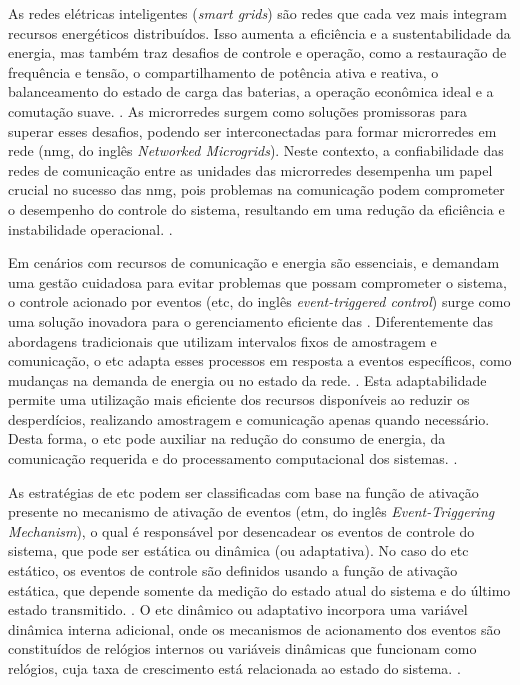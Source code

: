 As redes elétricas inteligentes (\textit{smart grids}) são redes que cada vez mais integram recursos energéticos distribuídos. Isso aumenta a eficiência e a sustentabilidade da energia, mas também traz desafios de controle e operação, como a restauração de frequência e tensão, o compartilhamento de potência ativa e reativa, o balanceamento do estado de carga das baterias, a operação econômica ideal e a comutação suave. \cite{Zhou2020}. As microrredes surgem como soluções promissoras para superar esses desafios, podendo ser interconectadas para formar microrredes em rede (\acrshort{nmg}, do inglês \textit{Networked Microgrids}). Neste contexto, a confiabilidade das redes de comunicação entre as unidades das microrredes desempenha um papel crucial no sucesso das \acrshort{nmg}, pois problemas na comunicação podem comprometer o desempenho do controle do sistema, resultando em uma redução da eficiência e instabilidade operacional. \cite{Zhou2020}.

Em cenários com recursos de comunicação e energia são essenciais, e demandam uma gestão cuidadosa para evitar problemas que possam comprometer o sistema, o controle acionado por eventos (\acrshort{etc}, do inglês \textit{event-triggered control}) surge como uma solução inovadora para o gerenciamento eficiente das . Diferentemente das abordagens tradicionais que utilizam intervalos fixos de amostragem e comunicação, o \acrshort{etc} adapta esses processos em resposta a eventos específicos, como mudanças na demanda de energia ou no estado da rede. \cite{coutinho2021}. Esta adaptabilidade permite uma utilização mais eficiente dos recursos disponíveis ao reduzir os desperdícios, realizando amostragem e comunicação apenas quando necessário. Desta forma, o \acrshort{etc} pode auxiliar na redução do consumo de energia, da comunicação requerida e do processamento computacional dos sistemas. \cite{coutinho2021}.


As estratégias de \acrshort{etc} podem ser classificadas com base na função de ativação presente no mecanismo de ativação de eventos (\acrshort{etm}, do inglês \textit{Event-Triggering Mechanism}), o qual é responsável por desencadear os eventos de controle do sistema, que pode ser estática ou dinâmica (ou adaptativa). No caso do \acrshort{etc} estático, os eventos de controle são definidos usando a função de ativação estática, que depende somente da medição do estado atual do sistema e do último estado transmitido. \cite{coutinho2021}. O \acrshort{etc} dinâmico ou adaptativo incorpora uma variável dinâmica interna adicional, onde os mecanismos de acionamento dos eventos são constituídos de relógios internos ou variáveis dinâmicas que funcionam como relógios, cuja taxa de crescimento está relacionada ao estado do sistema. \cite{Girard2015}.

